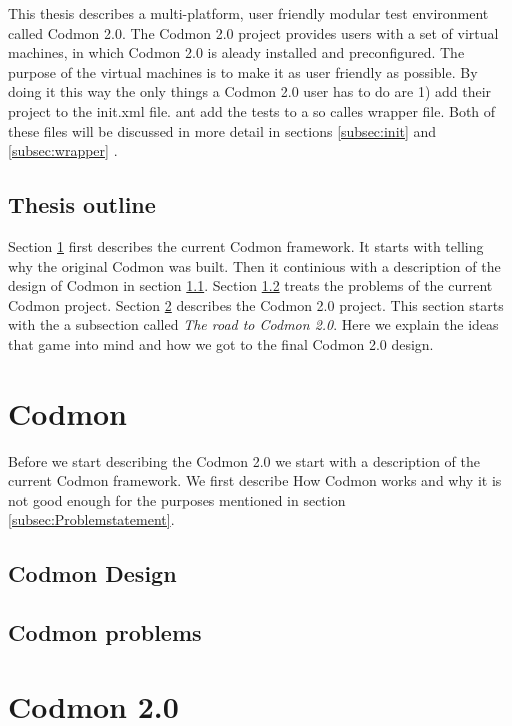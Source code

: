 \documentclass[a4paper,10pt]{scrartcl}
\newcommand{\project}{Codmon 2.0}
\begin{document}
\noindent This thesis describes a multi-platform, user friendly modular test environment called \project{}. The \project{} project provides users with a set of virtual machines,
in which \project{} is aleady installed and preconfigured. The purpose of the virtual machines is to make it as user friendly as possible. By doing it this way the only things
a \project{} user has to do are 1) add their project  to the init.xml file. ant add the tests to a so calles wrapper file. Both of these files will be discussed in more detail in 
sections \ref{subsec:init} and \ref{subsec:wrapper} .


\subsection{Thesis outline}
\label{subsec:Thesisoutline}
Section \ref{sec:codmon} first describes the current Codmon framework. It starts with telling why the original Codmon was built. Then it continious with a description of the design of Codmon
in section \ref{subsec:CodmonDesign}. Section \ref{subsec:CodmonProblems} treats the problems of the current Codmon project. Section \ref{sec:Codmon2.0} describes the \project{} project. This
section starts with the  a subsection called \emph{The road to \project{}}. Here we explain the ideas that game into mind and how we got to the final \project{} design.  

\newpage

\section{Codmon}
\label{sec:codmon}
Before we start describing the \project{} we start with a description of the current Codmon framework. We first describe How Codmon works and why it is not good enough for the purposes mentioned
in section \ref{subsec:Problemstatement}. 

\subsection{Codmon Design}
\label{subsec:CodmonDesign}
\subsection{Codmon problems}
\label{subsec:CodmonProblems}

\newpage
\section{\project{}}
\label{sec:Codmon2.0}
\end{document}

